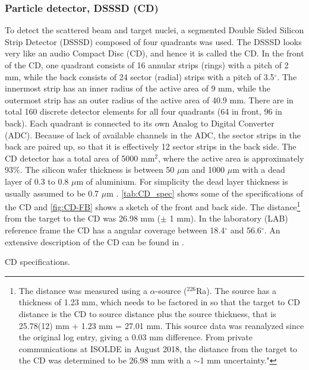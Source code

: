 \documentclass[twoside,english]{uiofysmaster/uiofysmaster}
\begin{document}
\subsubsection{Particle detector, DSSSD (CD)}
To detect the scattered beam and target nuclei, a segmented Double Sided Silicon Strip Detector (DSSSD) composed of four quadrants was used. The DSSSD looks very like an audio Compact Disc (CD), and hence it is called the CD. In the front of the CD, one quadrant consists of 16 annular strips (rings) with a pitch of 2 mm, while the back consists of 24 sector (radial) strips with a pitch of 3.5$^\circ$. The innermost strip has an inner radius of the active area of 9 mm, while the outermost strip has an outer radius of the active area of 40.9 mm. There are in total 160 discrete detector elements for all four quadrants (64 in front, 96 in back). Each quadrant is connected to its own Analog to Digital Converter (ADC). Because of lack of available channels in the ADC, the sector strips in the back are paired up, so that it is effectively 12 sector strips in the back side. The CD detector has a total area of 5000 mm$^2$, where the active area is approximately 93$\%$. The silicon wafer thickness is between 50 $\mu$m and 1000 $\mu$m with a dead layer of 0.3 to 0.8 $\mu$m of aluminium. For simplicity the dead layer thickness is usually assumed to be 0.7 $\mu$m \cite{NWarr-CD, MB-spect}. \autoref{tab:CD_spec} shows some of the specifications of the CD and \autoref{fig:CD-FB} shows a sketch of the front and back side. 
The distance\footnote{The distance was measured using a $\alpha$-source ($^{226}$Ra). The source has a thickness of 1.23 mm, which needs to be factored in so that the target to CD distance is the CD to source distance plus the source thickness, that is 25.78(12) mm + 1.23 mm = 27.01 mm. This source data was reanalyzed since the original log entry, giving a 0.03 mm difference. From private communications at ISOLDE in August 2018, the distance from the target to the CD was determined to be 26.98 mm with a $\sim$1 mm uncertainty."} from the target to the CD was 26.98 mm ($\pm$ 1 mm). In the laboratory (LAB) reference frame the CD has a angular coverage between 18.4$^\circ$ and 56.6$^\circ$. An extensive description of the CD can be found in \cite{CD-DSSSD}.

\begin{table}[ht] 
    \centering 
    \caption{CD specifications.}
	
	\label{tab:CD_spec}
\end{table}
\end{document}
